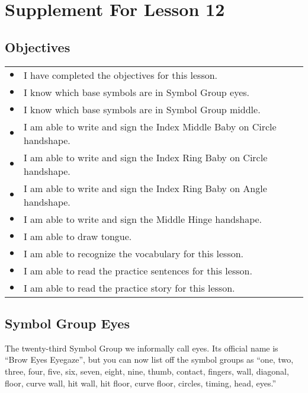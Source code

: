 \documentclass{article}
\begin{document}
\newfontfamily{}
\newfontfamily{}
\newcommand{\bul}{\hfil$\bullet$&}
\renewenvironment{glossary}{\begin{multicols}{5}\begin{center}}{\end{center}\end{multicols}}
\setcounter{secnumdepth}{0}
\setlength{\columnseprule}{1pt}

\section{Supplement For Lesson 12}

\subsection{Objectives}

\begin{tabular}{p{1cm}p{14cm}}
\bul I have completed the objectives for this lesson.\\
\bul I know which base symbols are in Symbol Group eyes.\\
\bul I know which base symbols are in Symbol Group middle.\\
\bul I am able to write and sign the Index Middle Baby on Circle handshape.\\
\bul I am able to write and sign the Index Ring Baby on Circle handshape.\\
\bul I am able to write and sign the Index Ring Baby on Angle handshape.\\
\bul I am able to write and sign the Middle Hinge handshape.\\
\bul I am able to draw tongue.\\
\bul I am able to recognize the vocabulary for this lesson.\\
\bul I am able to read the practice sentences for this lesson.\\
\bul I am able to read the practice story for this lesson.\\
\end{tabular}

\subsection{Symbol Group Eyes}

The twenty-third Symbol Group we informally call eyes.
Its official name is ``Brow Eyes Eyegaze'', but you can now list off the symbol groups as ``one, two, three, four, five, six, seven, eight, nine, thumb, contact, fingers, wall, diagonal, floor, curve wall, hit wall, hit floor, curve floor, circles, timing, head, eyes.''
\end{document}
